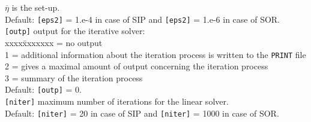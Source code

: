 \documentclass[12pt]{book}
\begin{document}
\begin{tabbing}
                  $\overline{\eta}$ is the set-up.\\
                  Default: {\tt [eps2]} = 1.e-4 in case of SIP and {\tt [eps2]} = 1.e-6 in case of SOR.\-\\
{\tt [outp]}   \> output for the iterative solver:\+\\
                  \pushtabs
                  xxxx\=xxxxxxx  \> = no output\\
                  1 \> = additional information about the iteration process is written to the {\tt PRINT} file\\
                  2 \> = gives a maximal amount of output concerning the iteration process\\
                  3 \> = summary of the iteration process\\
                  \poptabs
                  Default: {\tt [outp]} = 0.\-\\
{\tt [niter]}  \> maximum number of iterations for the linear solver.\+\\
                  Default: {\tt [niter]} = 20 in case of SIP and {\tt [niter]} = 1000 in case of SOR.\-\\
\end{tabbing}
\end{document}
